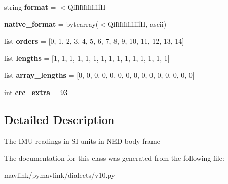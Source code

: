 \begin{DoxyCompactItemize}
\item 
\mbox{\label{classpymavlink_1_1dialects_1_1v10_1_1MAVLink__highres__imu__message_a6320fb24408ad314a408b975f0163271}} 
string {\bfseries format} = \textquotesingle{}$<$QfffffffffffffH\textquotesingle{}
\item 
\mbox{\label{classpymavlink_1_1dialects_1_1v10_1_1MAVLink__highres__imu__message_a16fb3c5f9dcd83c71b5bf880d1b04731}} 
{\bfseries native\+\_\+format} = bytearray(\textquotesingle{}$<$QfffffffffffffH\textquotesingle{}, \textquotesingle{}ascii\textquotesingle{})
\item 
\mbox{\label{classpymavlink_1_1dialects_1_1v10_1_1MAVLink__highres__imu__message_a20dec251baccef9e10941ec5a0dae371}} 
list {\bfseries orders} = \mbox{[}0, 1, 2, 3, 4, 5, 6, 7, 8, 9, 10, 11, 12, 13, 14\mbox{]}
\item 
\mbox{\label{classpymavlink_1_1dialects_1_1v10_1_1MAVLink__highres__imu__message_a6cbf049eafd2d4ebaadbefc67c3f596e}} 
list {\bfseries lengths} = \mbox{[}1, 1, 1, 1, 1, 1, 1, 1, 1, 1, 1, 1, 1, 1, 1\mbox{]}
\item 
\mbox{\label{classpymavlink_1_1dialects_1_1v10_1_1MAVLink__highres__imu__message_a00aa81051e74b59a187e09fe749184f7}} 
list {\bfseries array\+\_\+lengths} = \mbox{[}0, 0, 0, 0, 0, 0, 0, 0, 0, 0, 0, 0, 0, 0, 0\mbox{]}
\item 
\mbox{\label{classpymavlink_1_1dialects_1_1v10_1_1MAVLink__highres__imu__message_a5d226a0d15c2b9a186e567c7ef0fde3b}} 
int {\bfseries crc\+\_\+extra} = 93
\end{DoxyCompactItemize}


\subsection{Detailed Description}
\begin{DoxyVerb}The IMU readings in SI units in NED body frame
\end{DoxyVerb}
 

The documentation for this class was generated from the following file\+:\begin{DoxyCompactItemize}
\item 
mavlink/pymavlink/dialects/v10.\+py\end{DoxyCompactItemize}
